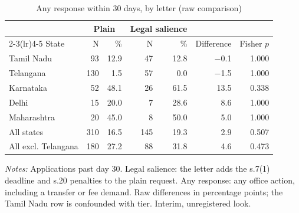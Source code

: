 \begin{table}[!htbp]
\centering
\caption{Any response within 30 days, by letter (raw comparison)}
\label{tab:tab_response_letter}
\small
\begin{threeparttable}
\begin{tabular}{lrrrrrr}
\toprule
& \multicolumn{2}{c}{Plain} & \multicolumn{2}{c}{Legal salience} & & \\ \cmidrule(lr){2-3}\cmidrule(lr){4-5} State & N & \% & N & \% & Difference & Fisher $p$ \\
\midrule
Tamil Nadu & 93 & 12.9 & 47 & 12.8 & $-$0.1 & 1.000 \\
Telangana & 130 & 1.5 & 57 & 0.0 & $-$1.5 & 1.000 \\
Karnataka & 52 & 48.1 & 26 & 61.5 & 13.5 & 0.338 \\
Delhi & 15 & 20.0 & 7 & 28.6 & 8.6 & 1.000 \\
Maharashtra & 20 & 45.0 & 8 & 50.0 & 5.0 & 1.000 \\
\midrule
All states & 310 & 16.5 & 145 & 19.3 & 2.9 & 0.507 \\
All excl. Telangana & 180 & 27.2 & 88 & 31.8 & 4.6 & 0.473 \\
\bottomrule
\end{tabular}
\begin{tablenotes}[flushleft]\footnotesize
\item \textit{Notes:} Applications past day 30. Legal salience: the letter adds the s.7(1) deadline and s.20 penalties to the plain request. Any response: any office action, including a transfer or fee demand. Raw differences in percentage points; the Tamil Nadu row is confounded with tier. Interim, unregistered look.
\end{tablenotes}
\end{threeparttable}
\end{table}

